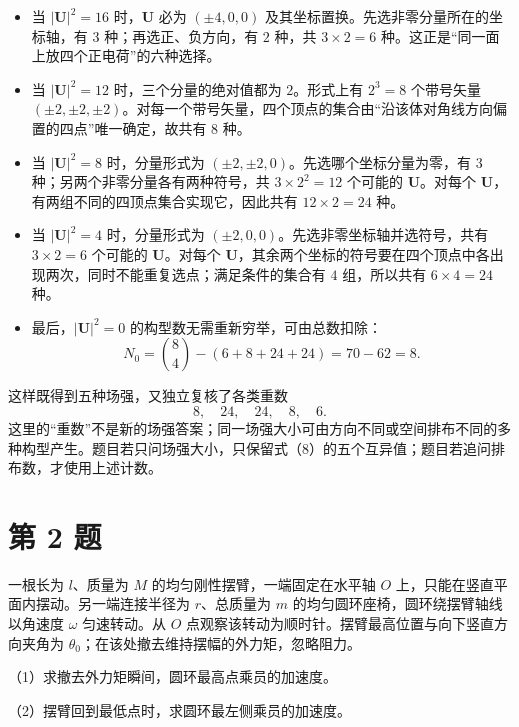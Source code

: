 \documentclass[12pt,a4paper,UTF8]{ctexart}
\newcommand{\tightlist}{\setlength{\itemsep}{0pt}\setlength{\parskip}{0pt}}
\begin{document}
\begin{itemize}
\tightlist
\item
  当 \(|\boldsymbol U|^2=16\) 时，\(\boldsymbol U\) 必为 \((\pm4,0,0)\)
  及其坐标置换。先选非零分量所在的坐标轴，有 \(3\)
  种；再选正、负方向，有 \(2\) 种，共 \(3\times2=6\)
  种。这正是``同一面上放四个正电荷''的六种选择。
\item
  当 \(|\boldsymbol U|^2=12\) 时，三个分量的绝对值都为 \(2\)。形式上有
  \(2^3=8\) 个带号矢量
  \((\pm2,\pm2,\pm2)\)。对每一个带号矢量，四个顶点的集合由``沿该体对角线方向偏置的四点''唯一确定，故共有
  \(8\) 种。
\item
  当 \(|\boldsymbol U|^2=8\) 时，分量形式为
  \((\pm2,\pm2,0)\)。先选哪个坐标分量为零，有 \(3\)
  种；另两个非零分量各有两种符号，共 \(3\times2^2=12\) 个可能的
  \(\boldsymbol U\)。对每个
  \(\boldsymbol U\)，有两组不同的四顶点集合实现它，因此共有
  \(12\times2=24\) 种。
\item
  当 \(|\boldsymbol U|^2=4\) 时，分量形式为
  \((\pm2,0,0)\)。先选非零坐标轴并选符号，共有 \(3\times2=6\) 个可能的
  \(\boldsymbol U\)。对每个
  \(\boldsymbol U\)，其余两个坐标的符号要在四个顶点中各出现两次，同时不能重复选点；满足条件的集合有
  \(4\) 组，所以共有 \(6\times4=24\) 种。
\item
  最后，\(|\boldsymbol U|^2=0\) 的构型数无需重新穷举，可由总数扣除： \[
  N_0=\binom84-(6+8+24+24)=70-62=8.
  \]
\end{itemize}

这样既得到五种场强，又独立复核了各类重数 \[
8,\quad 24,\quad 24,\quad 8,\quad 6.
\]
这里的``重数''不是新的场强答案；同一场强大小可由方向不同或空间排布不同的多种构型产生。题目若只问场强大小，只保留式（8）的五个互异值；题目若追问排布数，才使用上述计数。

\newpage

\section{第 2 题}\label{ux7b2c-2-ux9898}

一根长为 \(l\)、质量为 \(M\) 的均匀刚性摆臂，一端固定在水平轴 \(O\)
上，只能在竖直平面内摆动。另一端连接半径为 \(r\)、总质量为 \(m\)
的均匀圆环座椅，圆环绕摆臂轴线以角速度 \(\omega\) 匀速转动。从 \(O\)
点观察该转动为顺时针。摆臂最高位置与向下竖直方向夹角为
\(\theta_0\)；在该处撤去维持摆幅的外力矩，忽略阻力。

（1）求撤去外力矩瞬间，圆环最高点乘员的加速度。

（2）摆臂回到最低点时，求圆环最左侧乘员的加速度。
\end{document}
